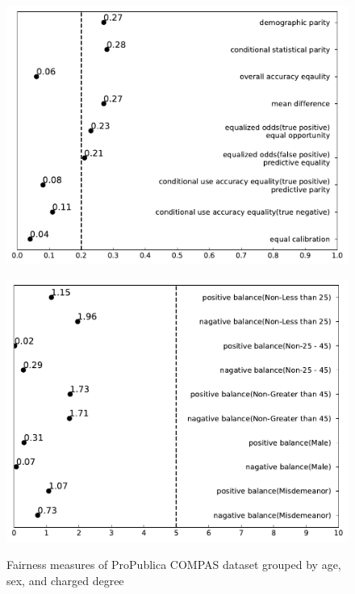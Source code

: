 \documentclass[conference]{IEEEtran}
\begin{document}
\begin{figure}[h]
\begin{minipage}[b]{0.48\linewidth}
        \includegraphics[width=\linewidth]{Non-Greater than 45}
        \label{fig:2}
    \end{minipage}
    \hfill
    \begin{minipage}[b]{0.48\linewidth}
        \centering
        \includegraphics[width=\linewidth]{misc balance}
        \label{fig:2}
    \end{minipage}
    \caption{Fairness measures of ProPublica COMPAS dataset grouped by age, sex, and charged degree}
    \label{fig:compas2}
\end{figure}

\FloatBarrier



\end{document}

